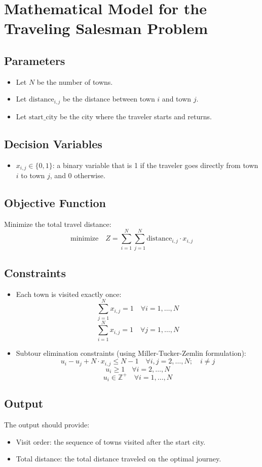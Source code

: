 \documentclass{article}
\begin{document}
\section*{Mathematical Model for the Traveling Salesman Problem}

\subsection*{Parameters}
\begin{itemize}
  \item Let \( N \) be the number of towns.
  \item Let \( \text{distance}_{i,j} \) be the distance between town \( i \) and town \( j \).
  \item Let \( \text{start\_city} \) be the city where the traveler starts and returns.
\end{itemize}

\subsection*{Decision Variables}
\begin{itemize}
  \item \( x_{i,j} \in \{0, 1\} \): a binary variable that is 1 if the traveler goes directly from town \( i \) to town \( j \), and 0 otherwise.
\end{itemize}

\subsection*{Objective Function}
Minimize the total travel distance:
\[
\text{minimize} \quad Z = \sum_{i=1}^N \sum_{j=1}^N \text{distance}_{i,j} \cdot x_{i,j}
\]

\subsection*{Constraints}
\begin{itemize}
  \item Each town is visited exactly once:
  \[
  \sum_{j=1}^N x_{i,j} = 1 \quad \forall i = 1, \ldots, N
  \]
  \[
  \sum_{i=1}^N x_{i,j} = 1 \quad \forall j = 1, \ldots, N
  \]

  \item Subtour elimination constraints (using Miller-Tucker-Zemlin formulation):
  \[
  u_i - u_j + N \cdot x_{i,j} \leq N - 1 \quad \forall i,j = 2, \ldots, N; \quad i \neq j
  \]
  \[
  u_i \geq 1 \quad \forall i = 2, \ldots, N
  \]
  \[
  u_i \in \mathbb{Z}^+ \quad \forall i = 1, \ldots, N
  \]
\end{itemize}

\subsection*{Output}
The output should provide:
\begin{itemize}
  \item Visit order: the sequence of towns visited after the start city.
  \item Total distance: the total distance traveled on the optimal journey.
\end{itemize}
\end{document}
